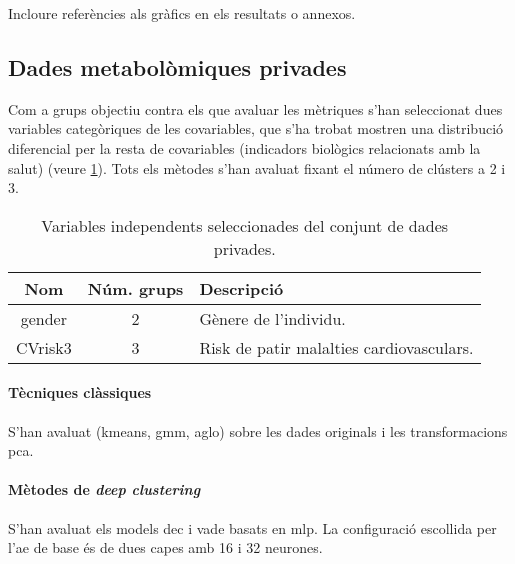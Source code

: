 \documentclass[CAT,BIB]{TFUOC}%
\newcommand{\todo}[1]{
            \begin{tcolorbox}[title=ToDo!, colback=red!5!white, colframe=red!50!black, coltext=red!50!black]
            #1
            \end{tcolorbox}}
\begin{document}
\todo{Incloure referències als gràfics en els resultats o annexos.}

        \subsection{Dades metabolòmiques privades}
        \label{s:dades_privades}

            Com a grups objectiu contra els que avaluar les mètriques
            s'han seleccionat dues variables categòriques de les covariables,
            que s'ha trobat mostren una distribució diferencial per la resta de covariables
            (indicadors biològics relacionats amb la salut) (veure \cref{t:dadespriv_vars}).
            Tots els mètodes s'han avaluat fixant el número de clústers a 2 i 3.

            \begin{table}[h]
                \small
                \centering
                \begin{tabular}{@{}ccl@{}}
                    \toprule
                    \textbf{Nom} & \textbf{Núm. grups} & \textbf{Descripció}    \\ \midrule
                    gender       & 2 & Gènere de l'individu.                    \\
                    CVrisk3      & 3 & Risk de patir malalties cardiovasculars. \\
                    \bottomrule
                \end{tabular}
                \caption[Dades privades: covariables seleccionades]{Variables independents seleccionades del conjunt de dades privades.}
                \label{t:dadespriv_vars}
            \end{table}

            \paragraph{Tècniques clàssiques}
                S'han avaluat (\gls{kmeans}, \gls{gmm}, \gls{aglo})
                sobre les dades originals i les transformacions \gls{pca}.

            \paragraph{Mètodes de \textit{deep clustering}}
                S'han avaluat els models \gls{dec} i \gls{vade}
                basats en \gls{mlp}.
                La configuració escollida per l'\gls{ae} de base
                és de dues capes amb 16 i 32 neurones.
\end{document}
